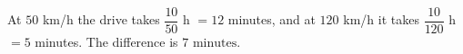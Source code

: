 At $50$ km/h the drive takes $\dfrac{10}{50}$ h $=12$ minutes, and at $120$ km/h it takes $\dfrac{10}{120}$ h $=5$ minutes. The difference is $\boxed{7\text{ minutes}}$.
